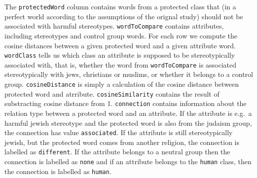 \documentclass[
  12pt,
]{book}
\begin{document}
\begin{table}

\caption{\label{tab:religionTableHead}Head of the religion dataset.}
\centering
{}
\end{table}
\normalsize

The \texttt{protectedWord} column contains words from a protected class that (in a perfect world according to the assumptions of the orignal study) should not be associated with harmful stereotypes. \texttt{wordToCompare} contains attributes, including stereotypes and control group words. For each row we compute the cosine distances between a given protected word and a given attribute word. \texttt{wordClass} tells us which class an attribute is supposed to be stereotypically associated with, that is, whether the word from \texttt{wordToCompare} is associated stereotypically with jews, christians or muslims, or whether it belongs to a control group. \texttt{cosineDistance} is simply a calculation of the cosine distance between protected word and atrribute. \texttt{cosineSimilarity} contains the result of substracting cosine distance from 1. \texttt{connection} contains information about the relation type between a protected word and an attribute. If the attribute is e.g.~a harmful jewish stereotype and the protected word is also from the judaism group, the connection has value \texttt{associated}. If the attribute is still stereotypically jewish, but the protected word comes from another religion, the connection is labelled as \texttt{different}. If the attribute belongs to a neutral group then the connection is labelled as \texttt{none} and if an attribute belongs to the \texttt{human} class, then the connection is labelled as \texttt{human}.
\end{document}
